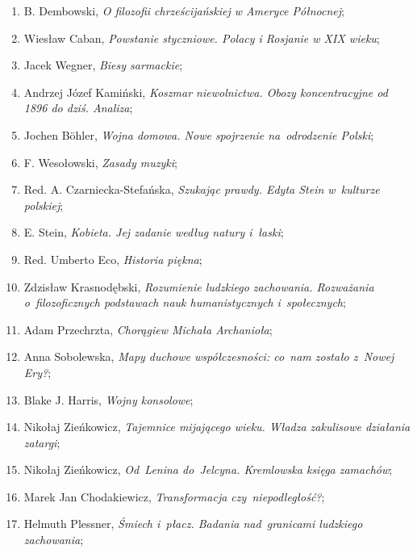 \documentclass[a4paper,11pt]{article}
\begin{document}
\begin{enumerate}
\item B. Dembowski, \emph{O filozofii chrześcijańskiej w Ameryce
    Północnej};

\item Wiesław Caban, \emph{Powstanie styczniowe. Polacy i Rosjanie w
    XIX wieku};

\item Jacek Wegner, \emph{Biesy sarmackie};

\item Andrzej Józef Kamiński, \emph{Koszmar niewolnictwa. Obozy
    koncentracyjne od 1896 do dziś. Analiza};

\item Jochen B\"{o}hler, \emph{Wojna domowa. Nowe spojrzenie
    na~odrodzenie Polski};

\item F. Wesołowski, \emph{Zasady muzyki};

\item Red. A. Czarniecka-Stefańska, \emph{Szukając prawdy. Edyta Stein
    w~kulturze polskiej};

\item E. Stein, \emph{Kobieta. Jej zadanie według natury i~łaski};

\item Red. Umberto Eco, \emph{Historia piękna};

\item Zdzisław Krasnodębski, \emph{Rozumienie ludzkiego zachowania.
    Rozważania o~filozoficznych podstawach nauk humanistycznych
    i~społecznych};

\item Adam Przechrzta, \emph{Chorągiew Michała Archanioła};

\item Anna Sobolewska, \emph{Mapy duchowe współczesności: co~nam
    zostało z~Nowej Ery?};

\item Blake J. Harris, \emph{Wojny konsolowe};

\item Nikołaj Zieńkowicz, \emph{Tajemnice mijającego wieku. Władza
    zakulisowe działania zatargi};

\item Nikołaj Zieńkowicz, \emph{Od~Lenina do~Jelcyna. Kremlowska
    księga zamachów};

\item Marek Jan Chodakiewicz, \emph{Transformacja czy~niepodległość?};

\item Helmuth Plessner, \emph{Śmiech i~płacz. Badania nad~granicami
    ludzkiego zachowania};


\end{enumerate}
\end{document}
